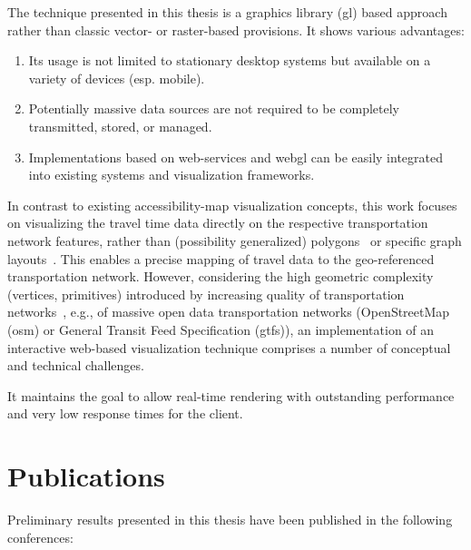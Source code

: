     The technique presented in this thesis is a graphics library (\acrshort{gl})
    based approach rather than classic vector- or raster-based provisions.
    It shows various advantages:\par

    \begin{enumerate}[\label=({A}1)]
      \item \label{enu:advnt:a1} Its usage is not limited to stationary desktop
        systems but available on a variety of devices (esp. mobile).
      \item \label{enu:advnt:a2} Potentially massive data sources are not
        required to be completely transmitted, stored, or managed.
      \item \label{enu:advnt:a3} Implementations based on web-services and
        \acrshort{webgl} can be easily integrated into existing systems and
        visualization frameworks.
    \end{enumerate}

    In contrast to existing accessibility-map visualization concepts, this work
    focuses on visualizing the travel time data directly on the respective
    transportation network features, rather than (possibility generalized)
    polygons~\cite{Glander2010} or specific graph layouts~\cite{Krause2012}.
    This enables a precise mapping of travel data to the geo-referenced
    transportation network. However, considering the high geometric complexity
    (vertices, primitives) introduced by increasing quality of transportation
    networks~\cite{Zielstra2010}, e.g., of massive open data transportation
    networks (OpenStreetMap (\acrshort{osm}) or General Transit Feed
    Specification (\acrshort{gtfs})),
    an implementation of an interactive web-based visualization technique
    comprises a number of conceptual and technical challenges.\par

    It maintains the goal to allow real-time rendering with outstanding
    performance and very low response times for the client.\par


  \section{Publications}
    \label{sec:intro:publc}

    Preliminary results presented in this thesis have been published in the
    following conferences:

